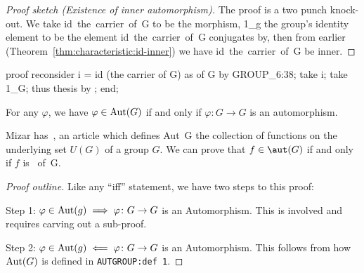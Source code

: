 \begin{proof}[Proof sketch (Existence of inner automorphism)]
The proof is a two punch knock-out. We take {\Tt{}id\ the\ carrier\ of\ G\nwendquote} to be the
morphism, {\Tt{}1{\_}g\nwendquote} the group's identity element to be the element
{\Tt{}id\ the\ carrier\ of\ G\nwendquote} conjugates by, then from earlier (Theorem~\ref{thm:characteristic:id-inner})
we have {\Tt{}id\ the\ carrier\ of\ G\nwendquote} be inner.
\end{proof}

\nwenddocs{}\endmoddef\nwstartdeflinemarkup{}\nwenddeflinemarkup
proof
  reconsider i = id (the carrier of G) as  of G by GROUP_6:38;
  take i;
  take 1_G;
  thus thesis by ;
end;
\nwendcode{}\nwdocspar

\begin{theorem}
For any $\varphi$, we have $\varphi\in\operatorname{Aut}(G)$ if and only if
$\varphi\colon G\to G$ is an automorphism.
\end{theorem}

\begin{thm-remark}
Mizar has~, an article which defines {\Tt{}Aut\ G\nwendquote} the
collection of functions on the underlying set $U(G)$ of a group $G$. We
can prove that $f\in\aut(G)$ if and only if $f$ is {\Tt{}\ of\ G\nwendquote}.
\end{thm-remark}

\begin{proof}[Proof outline]
  Like any ``if{}f'' statement, we have two steps to this proof:

  Step 1: $\varphi\in\operatorname{Aut}(g)\implies\varphi\colon G\to G$ is an
  Automorphism. This is involved and requires carving out a sub-proof.

  Step 2: $\varphi\in\operatorname{Aut}(g)\impliedby\varphi\colon G\to G$ is an
  Automorphism. This follows from how $\operatorname{Aut}(G)$ is defined in
  \verb#AUTGROUP:def 1#.
\end{proof}

